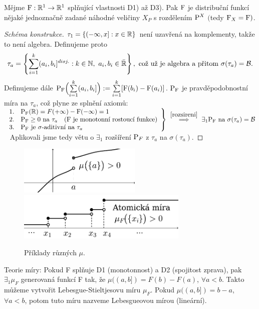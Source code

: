 \begin{theorem}
	Mějme $\mathrm{F}:\mathbb{R}^1\to\mathbb{R}^1$ splňující vlastnosti D1) až D3). Pak $\mathrm{F}$ je distribuční funkcí nějaké jednoznačně zadané náhodné veličiny $X_P$ s rozdělením $\mathrm{P}^X$ $($tedy $\mathrm{F}_X=\mathrm{F})$.
	\begin{proof}[Schéma konstrukce]
		$\tau_1= \{ (-\infty,x]:x\in\mathbb{R} \}$ není uzavřená na komplementy, takže to není algebra. Definujeme proto
		$$ \tau_a = \left\{ \sum\limits_{i=1}^k (a_i,b_i]^{disj.}: k \in\mathbb{N},~a_i,b_i \in\bar{\mathbb{R}} \right\},~ \text{což už je algebra a přitom $\sigma(\tau_a)=\mathcal{B}$.}  $$
	Definujeme dále $\mathrm{P}_{\mathrm{F}}\Bigl(\sum\limits_{i=1}^k (a_i,b_i] \Bigr) :=\sum\limits_{i=1}^k [\mathrm{F}(b_i)-\mathrm{F}(a_i)]$. $\mathrm{P}_{\mathrm{F}}$ je pravděpodobnostní míra na $\tau_a$, což plyne ze splnění axiomů:
\newline ~\newline	$	\left.\begin{array}{ll}
1.	& \mathrm{P}_{\mathrm{F}}(\mathbb{R})=F(+\infty)-\mathrm{F}(-\infty)=1 \\ 
2.	& \mathrm{P}_{\mathrm{F}} \geq 0\text{ na }\tau_a~~~(\mathrm{F}\text{ je  monotonní rostoucí funkce}) \\ 
3.	& \mathrm{P}_{\mathrm{F}}\text{ je }\sigma\text{-aditivní na }\tau_a
	\end{array}\right\}  ~\stackrel{\ref{rozsireni}}{\Longrightarrow}~ \exists_1  \mathrm{P}_{\mathrm{F}} \text{ na } \sigma(\tau_a) =\mathcal{B} 
	$\newline~\newline
	Aplikovali jsme tedy větu o $\exists_1 $ rozšíření $\mathrm{P}_F$ z $\tau_a$ na $\sigma(\tau_a)$.
	\end{proof}
\end{theorem}
\begin{figure}[h]
\centering
\includegraphics[height=2.3cm]{mira1}\hspace{10mm}
\includegraphics[height=2.3cm]{mira2}
\caption{Příklady různých $\mu$.}
\label{fig:mira1}
\end{figure}
\begin{dusl}
	Teorie míry: Pokud F splňuje D1 (monotonnost) a D2 (spojitost zprava), pak $\exists_1  \mu_F$ generovaná funkcí F tak, že $\mu((a,b])=F(b)-F(a)$, $\forall a<b$. Takto můžeme vytvořit Lebesgue-Stieltjesovu míru $\mu_F$. Pokud $\mu((a,b])=b-a$, $\forall a<b$, potom tuto míru nazveme Lebesgueovou mírou (lineární).
\end{dusl}
